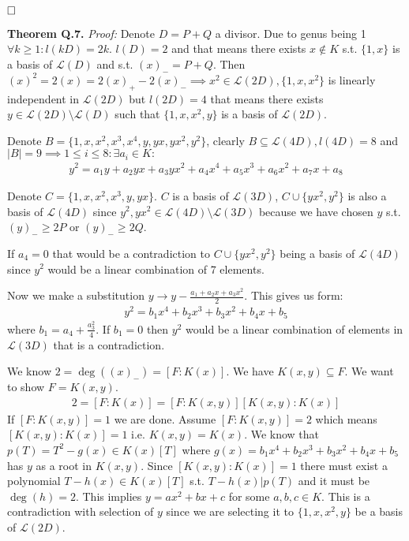 \documentclass[12pt, a4paper]{article}
\newcommand{\qed}{\hfill\square}
\begin{document}
$\qed$

\textbf{Theorem Q.7.} \textit{Proof:}
Denote $D = P + Q$ a divisor. Due to genus being 1 $\forall k\geq 1: l(kD) = 2k$. $l(D)=2$ and that means there exists $x \notin K$ s.t. $\{1,x\}$ is a basis of $\mathcal{L}(D)$ and s.t. $(x)_{-} = P+Q$. Then $(x)^2 = 2(x) = 2(x)_{+}-2(x)_{-} \implies x^2 \in \mathcal{L}(2D),\{1,x,x^2\}$ is linearly independent in $\mathcal{L}(2D)$ but $l(2D)=4$ that means there exists $y \in \mathcal{L}(2D)\setminus \mathcal{L}(D)$ such that $\{1,x,x^2,y\}$ is a basis of $\mathcal{L}(2D)$. 

Denote $B = \{1,x,x^2,x^3,x^4,y,yx,yx^2,y^2\}$, clearly $B \subseteq \mathcal{L}(4D), l(4D)=8$ and $|B|=9 \implies 1 \leq i \leq 8: \exists a_i \in K:$
\begin{gather*}
y^2 = a_1y + a_2yx + a_3yx^2 + a_4x^4 + a_5x^3 + a_6x^2 + a_7x+ a_8
\end{gather*}

Denote $C = \{1,x,x^2,x^3,y,yx\}$. $C$ is a basis of $\mathcal{L}(3D)$, $C \cup \{yx^2,y^2\}$ is also a basis of $\mathcal{L}(4D)$ since $y^2,yx^2 \in \mathcal{L}(4D) \setminus \mathcal{L}(3D)$ because we have chosen $y$ s.t. $(y)_{-} \geq 2P$ or $(y)_{-} \geq 2Q$.

If $a_4=0$ that would be a contradiction to $C \cup \{yx^2,y^2\}$ being a basis of $\mathcal{L}(4D)$ since $y^2$ would be a linear combination of 7 elements.

Now we make a substitution $y \rightarrow y - \frac{a_1+a_2x+a_3x^2}{2}$. This gives us form:
\begin{gather*}
y^2 =b_1x^4 + b_2x^3 + b_3x^2 + b_4x+ b_5
\end{gather*}
where $b_1 = a_4+\frac{a_3^2}{4}$. If $b_1=0$ then $y^2$ would be a linear combination of elements in $\mathcal{L}(3D)$ that is a contradiction.

We know $2=\deg((x)_{-})=[F:K(x)]$. We have $K(x,y) \subseteq F$. We want to show $F=K(x,y)$.
\begin{gather*}
2=[F:K(x)]=[F:K(x,y)][K(x,y):K(x)]
\end{gather*}
If $[F:K(x,y)] = 1$ we are done. Assume $[F:K(x,y)]=2$ which means $[K(x,y):K(x)]=1$ i.e. $K(x,y)=K(x)$. We know that $p(T)=T^2-g(x) \in K(x)[T]$ where $g(x)=b_1x^4 + b_2x^3 + b_3x^2 + b_4x+ b_5$ has $y$ as a root in $K(x,y)$. Since $[K(x,y):K(x)]=1$ there must exist a polynomial $T-h(x) \in K(x)[T]$ s.t. $T-h(x)|p(T)$ and it must be $\deg(h)=2$. This implies $y=ax^2+bx+c$ for some $a,b,c \in K$. This is a contradiction with selection of $y$ since we are selecting it to $\{1,x,x^2,y\}$ be a basis of $\mathcal{L}(2D)$.
\end{document}
